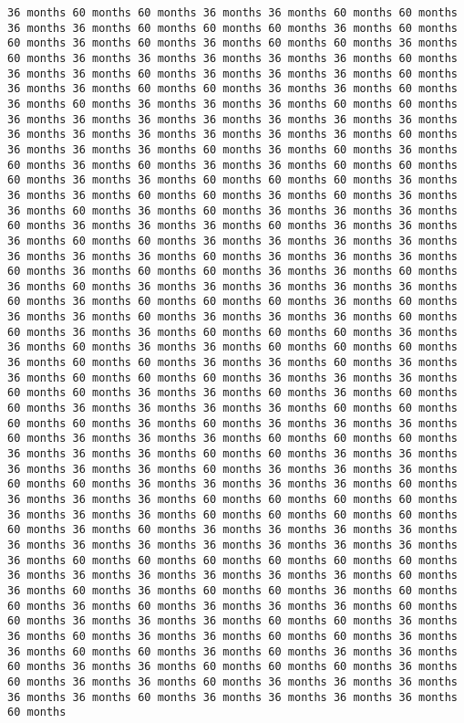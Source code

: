 \documentclass[11pt]{article}
\begin{document}
\begin{Verbatim}[commandchars=\\\{\}, frame=single, framerule=2mm, rulecolor=\color{outerrorbackground}]
36 months 60 months 60 months 36 months 36 months 60 months 60 months 36 months 36 months 60 months 60 months 60 months 36 months 60 months 60 months 36 months 60 months 36 months 60 months 60 months 36 months 60 months 36 months 36 months 36 months 36 months 36 months 60 months 36 months 36 months 60 months 36 months 36 months 36 months 60 months 36 months 36 months 60 months 60 months 36 months 36 months 60 months 36 months 60 months 36 months 36 months 36 months 60 months 60 months 36 months 36 months 36 months 36 months 36 months 36 months 36 months 36 months 36 months 36 months 36 months 36 months 36 months 60 months 36 months 36 months 36 months 60 months 36 months 60 months 36 months 60 months 36 months 60 months 36 months 36 months 60 months 60 months 60 months 36 months 36 months 60 months 60 months 60 months 36 months 36 months 36 months 60 months 60 months 36 months 60 months 36 months 36 months 60 months 36 months 60 months 36 months 36 months 36 months 60 months 36 months 36 months 36 months 60 months 36 months 36 months 36 months 60 months 60 months 36 months 36 months 36 months 36 months 36 months 36 months 36 months 60 months 36 months 36 months 36 months 60 months 36 months 60 months 60 months 36 months 36 months 60 months 36 months 60 months 36 months 36 months 36 months 36 months 36 months 60 months 36 months 60 months 60 months 60 months 36 months 60 months 36 months 36 months 60 months 36 months 36 months 36 months 60 months 60 months 36 months 36 months 60 months 60 months 60 months 36 months 36 months 60 months 36 months 36 months 60 months 60 months 60 months 36 months 60 months 60 months 36 months 36 months 60 months 36 months 36 months 60 months 60 months 60 months 36 months 36 months 36 months 60 months 60 months 36 months 36 months 60 months 36 months 60 months 60 months 36 months 36 months 36 months 36 months 60 months 60 months 60 months 60 months 36 months 60 months 36 months 36 months 36 months 60 months 36 months 36 months 36 months 60 months 60 months 60 months 36 months 36 months 36 months 60 months 60 months 36 months 36 months 36 months 36 months 36 months 60 months 36 months 36 months 36 months 60 months 60 months 36 months 36 months 36 months 36 months 60 months 36 months 36 months 36 months 60 months 60 months 60 months 60 months 36 months 36 months 36 months 60 months 60 months 60 months 60 months 60 months 36 months 60 months 36 months 36 months 36 months 36 months 36 months 36 months 36 months 36 months 36 months 36 months 36 months 36 months 60 months 60 months 60 months 60 months 60 months 60 months 36 months 36 months 36 months 36 months 36 months 36 months 60 months 36 months 60 months 36 months 60 months 60 months 36 months 60 months 60 months 36 months 60 months 36 months 36 months 36 months 60 months 60 months 36 months 36 months 36 months 60 months 60 months 36 months 36 months 60 months 36 months 36 months 60 months 60 months 36 months 36 months 60 months 60 months 36 months 60 months 36 months 36 months 60 months 36 months 36 months 60 months 60 months 60 months 36 months 60 months 36 months 36 months 60 months 36 months 36 months 36 months 36 months 36 months 60 months 36 months 36 months 36 months 36 months 60 months 
\end{Verbatim}
\end{document}
